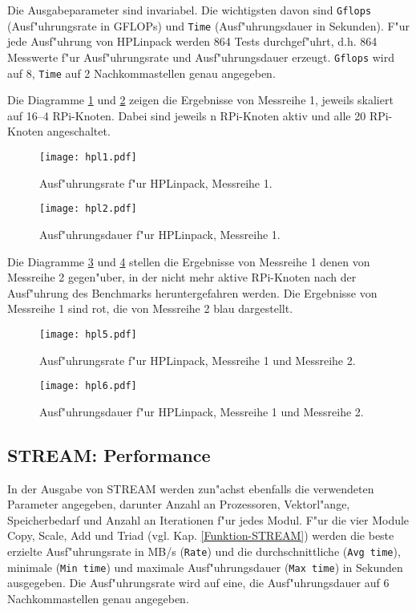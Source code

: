 Die Ausgabeparameter sind invariabel. Die wichtigsten davon sind \texttt{Gflops} (Ausf"uhrungsrate in GFLOPs) und \texttt{Time} (Ausf"uhrungsdauer in Sekunden). F"ur jede Ausf"uhrung von HPLinpack werden 864 Tests durchgef"uhrt, d.h. 864 Messwerte f"ur Ausf"uhrungsrate und Ausf"uhrungsdauer erzeugt. \texttt{Gflops} wird auf 8, \texttt{Time} auf 2 Nachkommastellen genau angegeben. 

Die Diagramme \ref{fig:hpl1} und \ref{fig:hpl2} zeigen die Ergebnisse von Messreihe 1, jeweils skaliert auf 16--4 RPi-Knoten. Dabei sind jeweils n RPi-Knoten aktiv und alle 20 RPi-Knoten angeschaltet.
\begin{figure}[htb]
  \centering
  \texttt{[image: hpl1.pdf]}\\ 
  \caption{Ausf"uhrungsrate f"ur HPLinpack, Messreihe 1.}
  \label{fig:hpl1}		
\end{figure}
\begin{figure}[htb]
  \centering
  \texttt{[image: hpl2.pdf]}\\ 
  \caption{Ausf"uhrungsdauer f"ur HPLinpack, Messreihe 1.}
  \label{fig:hpl2}		
\end{figure}
\noindent
Die Diagramme \ref{fig:hpl5} und \ref{fig:hpl6} stellen die Ergebnisse von Messreihe 1 denen von Messreihe 2 gegen"uber, in der nicht mehr aktive RPi-Knoten nach der Ausf"uhrung des Benchmarks heruntergefahren werden. Die Ergebnisse von Messreihe 1 sind rot, die von Messreihe 2 blau dargestellt.
\begin{figure}[htb]
  \centering
  \texttt{[image: hpl5.pdf]}\\ 
  \caption{Ausf"uhrungsrate f"ur HPLinpack, Messreihe 1 und Messreihe 2.}\label{fig:hpl5}
\end{figure}
\begin{figure}[htb]
  \centering
  \texttt{[image: hpl6.pdf]}\\ 
  \caption{Ausf"uhrungsdauer f"ur HPLinpack, Messreihe 1 und Messreihe 2.}\label{fig:hpl6}
\end{figure}
\subsection{STREAM: Performance}\label{Ergebnisse-Stream}

In der Ausgabe von STREAM werden zun"achst ebenfalls die verwendeten Parameter angegeben, darunter Anzahl an Prozessoren, Vektorl"ange, Speicherbedarf und Anzahl an Iterationen f"ur jedes Modul. F"ur die vier Module Copy, Scale, Add und Triad (vgl. Kap. \ref{Funktion-STREAM}) werden die beste erzielte Ausf"uhrungsrate in MB/s (\texttt{Rate}) und die durchschnittliche (\texttt{Avg time}), minimale (\texttt{Min time}) und maximale Ausf"uhrungsdauer (\texttt{Max time}) in Sekunden ausgegeben. Die Ausf"uhrungsrate wird auf eine, die Ausf"uhrungsdauer auf 6 Nachkommastellen genau angegeben. 

